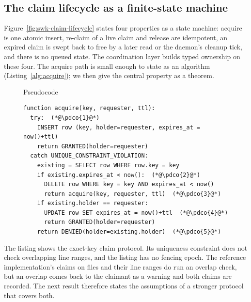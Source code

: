 \documentclass[11pt,a4paper]{article}
\theoremstyle{definition}
\theoremstyle{remark}
\begin{document}
\subsection{The claim lifecycle as a finite-state machine}
\label{sec:swk-lifecycle}

Figure~\ref{fig:swk-claim-lifecycle} states four properties as a state machine:
acquire is one atomic insert, re-claim of a live claim and release are
idempotent, an expired claim is swept back to free by a later read or the daemon's cleanup tick, and there
is no queued state.
The coordination layer builds typed ownership on these four. The acquire
path is small enough to state as an algorithm (Listing~\ref{alg:acquire}); we
then give the central property as a theorem.
\begin{figure}[H]
\centering
\begin{minipage}{0.96\textwidth}
\begin{pdlisting}{Pseudocode}{}
\lstset{style=pseudocode}
\begin{lstlisting}[caption={Claim acquisition. The whole acquire is a single
insert against a uniqueness constraint; the loser is handed the current holder,
not an error to retry blindly. Expiry is checked before the holder, so a
holder's own claim after its lease expired is a new acquisition.},label={alg:acquire},captionpos=b]
function acquire(key, requester, ttl):
  try:  (*@\pdco{1}@*)
    INSERT row (key, holder=requester, expires_at = now()+ttl)
    return GRANTED(holder=requester)
  catch UNIQUE_CONSTRAINT_VIOLATION:
    existing = SELECT row WHERE row.key = key
    if existing.expires_at < now():  (*@\pdco{2}@*)
      DELETE row WHERE key = key AND expires_at < now()
      return acquire(key, requester, ttl)  (*@\pdco{3}@*)
    if existing.holder == requester:
      UPDATE row SET expires_at = now()+ttl  (*@\pdco{4}@*)
      return GRANTED(holder=requester)
    return DENIED(holder=existing.holder)  (*@\pdco{5}@*)
\end{lstlisting}
\begin{pdcallouts}
\end{pdcallouts}
\end{pdlisting}
\end{minipage}
\end{figure}
The listing shows the exact-key claim protocol. Its uniqueness constraint
does not check overlapping line ranges, and the listing has no fencing epoch.
The reference implementation's claims on files and their line ranges do run an
overlap check, but an overlap comes back to the claimant as a warning and both
claims are recorded. The next result therefore states the assumptions of a
stronger protocol that covers both.
\end{document}
